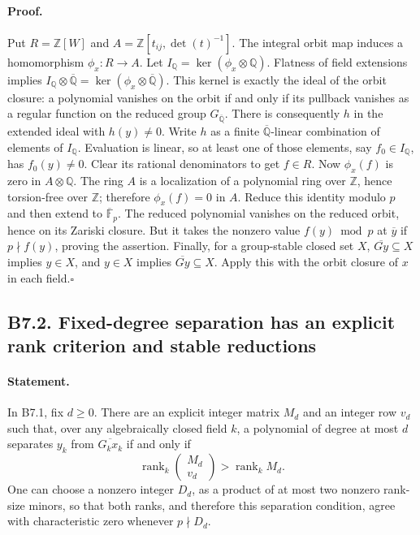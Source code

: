 \documentclass[11pt,a4paper]{article}
\begin{document}
\paragraph{Proof.}
Put $R=\mathbb Z[W]$ and
$A=\mathbb Z[t_{ij},\det(t)^{-1}]$.  The integral orbit map induces a
homomorphism $\phi_x:R\to A$.  Let
$I_{\mathbb Q}=\ker(\phi_x\otimes\mathbb Q)$.
Flatness of field extensions implies
$I_{\mathbb Q}\otimes\overline{\mathbb Q}
=\ker(\phi_x\otimes\overline{\mathbb Q})$.
This kernel is exactly the ideal of the orbit closure: a polynomial
vanishes on the orbit if and only if its pullback vanishes as a regular
function on the reduced group $G_{\overline{\mathbb Q}}$.
There is consequently $h$ in the extended ideal with $h(y)\neq0$.
Write $h$ as a finite $\overline{\mathbb Q}$-linear combination of
elements of $I_{\mathbb Q}$.  Evaluation is linear, so at least one of
those elements, say $f_0\in I_{\mathbb Q}$, has $f_0(y)\neq0$.
Clear its rational denominators to get $f\in R$.
Now $\phi_x(f)$ is zero in $A\otimes\mathbb Q$.
The ring $A$ is a localization of a polynomial ring over $\mathbb Z$,
hence torsion-free over $\mathbb Z$; therefore $\phi_x(f)=0$ in $A$.
Reduce this identity modulo $p$ and then extend to
$\overline{\mathbb F}_p$.  The reduced polynomial vanishes on the
reduced orbit, hence on its Zariski closure.  But it takes the nonzero
value $f(y)\bmod p$ at $\overline y$ if $p\nmid f(y)$, proving the
assertion.  Finally, for a group-stable closed set $X$,
$\overline{Gy}\subseteq X$ implies $y\in X$, and $y\in X$ implies
$\overline{Gy}\subseteq X$.  Apply this with the orbit closure of
$x$ in each field.\hfill$\square$

\subsection*{B7.2. Fixed-degree separation has an explicit rank criterion and stable reductions}
\paragraph{Statement.}
In B7.1, fix $d\geq0$.  There are an explicit integer matrix $M_d$
and an integer row $v_d$ such that, over any algebraically closed field
$k$, a polynomial of degree at most $d$ separates $y_k$ from
$\overline{G_kx_k}$ if and only if
\[
 \operatorname{rank}_k\begin{pmatrix}M_d\\v_d\end{pmatrix}
    >\operatorname{rank}_k M_d.                    \tag{B7.2}
\]
One can choose a nonzero integer $D_d$, as a product of at most two
nonzero rank-size minors, so that both ranks, and therefore this
separation condition, agree with characteristic zero whenever
$p\nmid D_d$.
\end{document}
